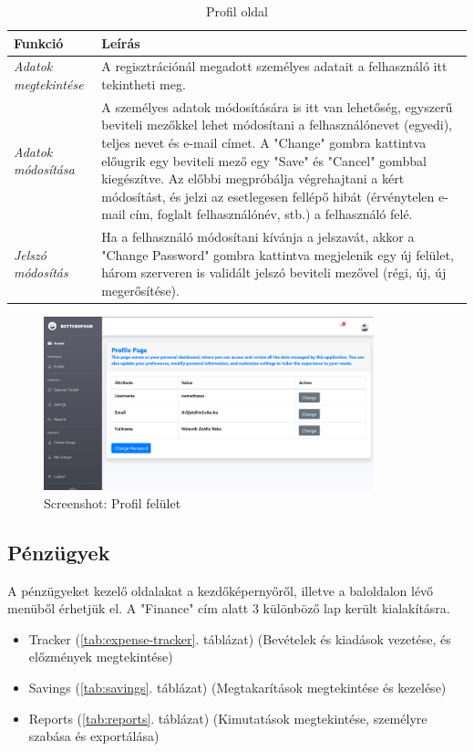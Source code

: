 \begin{table}[H]
	\centering
	\begin{tabular}{ | m{} | m{} | }
		\hline
		\textbf{Funkció} & \textbf{Leírás} \\
		\hline \hline
		\emph{Adatok megtekintése} & A regisztrációnál megadott személyes adatait a felhasználó itt tekintheti meg. \\
		\hline
		\emph{Adatok módosítása} &  A személyes adatok módosítására is itt van lehetőség, egyszerű beviteli mezőkkel lehet módosítani a felhasználónevet (egyedi), teljes nevet és e-mail címet. A "Change" gombra kattintva előugrik egy beviteli mező egy "Save" és "Cancel" gombbal kiegészítve. Az előbbi megpróbálja végrehajtani a kért módosítást, és jelzi az esetlegesen fellépő hibát (érvénytelen e-mail cím, foglalt felhasználónév, stb.) a felhasználó felé.  \\
		\hline
		\emph{Jelszó módosítás} & Ha a felhasználó módosítani kívánja a jelszavát, akkor a "Change Password" gombra kattintva megjelenik egy új felület, három szerveren is validált jelszó beviteli mezővel (régi, új, új megerősítése). \\
		\hline
	\end{tabular}
	\caption{Profil oldal}
	\label{tab:profile}
\end{table}

\begin{figure}[H]
	\centering
	\includegraphics[height=190px]{img/profile}
	\caption{Screenshot: Profil felület}
	\label{fig:profile}
\end{figure}

\subsection{Pénzügyek}
A pénzügyeket kezelő oldalakat a kezdőképernyőről, illetve a baloldalon lévő menüből érhetjük el. A "Finance" cím alatt 3 különböző lap került kialakításra.
\begin{itemize}
	\item Tracker (\ref{tab:expense-tracker}. táblázat) (Bevételek és kiadások vezetése, és előzmények megtekintése)
	\item Savings (\ref{tab:savings}. táblázat) (Megtakarítások megtekintése és kezelése)
	\item Reports (\ref{tab:reports}. táblázat) (Kimutatások megtekintése, személyre szabása és exportálása) 
\end{itemize}

